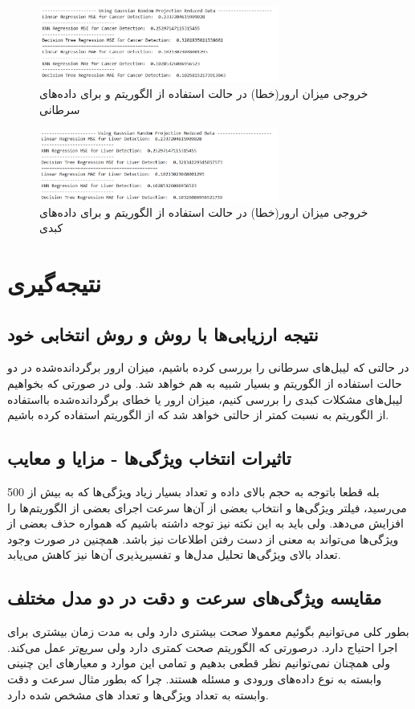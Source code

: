 \documentclass{article}
\begin{document}
\newpage
\begin{figure}[ht]
        \centering
        \includegraphics[width=0.7\textwidth]{gau-cancer.png}
        \caption{خروجی میزان ارور(خطا) در حالت استفاده از الگوریتم  و برای داده‌های سرطانی}
        \label{fig:fig5}
\end{figure}

\begin{figure}[ht]
        \centering
        \includegraphics[width=0.7\textwidth]{gau-liver.png}
        \caption{خروجی میزان ارور(خطا) در حالت استفاده از الگوریتم  و برای داده‌های کبدی}
        \label{fig:fig6}
\end{figure}

\newpage
\section{نتیجه‌گیری}
\subsection{نتیجه ارزیابی‌ها با روش  و روش انتخابی خود}
در حالتی که لیبل‌های سرطانی را بررسی کرده باشیم، میزان ارور برگردانده‌شده در دو حالت استفاده از الگوریتم  و  بسیار شبیه به هم خواهد شد. ولی در صورتی که بخواهیم لیبل‌های مشکلات کبدی را بررسی کنیم، میزان ارور یا خطای برگردانده‌شده بااستفاده از الگوریتم  به نسبت کمتر از حالتی خواهد شد که از الگوریتم  استفاده کرده باشیم.
\subsection{تاثیرات انتخاب ویژگی‌ها - مزایا و معایب}
بله قطعا باتوجه به حجم بالای داده و تعداد بسیار زیاد ویژگی‌ها که به بیش از 500 می‌رسید، فیلتر ویژگی‌ها و انتخاب بعضی از آن‌ها سرعت اجرای بعضی از الگوریتم‌ها را افزایش می‌دهد. ولی باید به این نکته نیز توجه داشته باشیم که همواره حذف بعضی از ویژگی‌ها می‌تواند به معنی از دست رفتن اطلاعات نیز باشد. همچنین در صورت وجود تعداد بالای ویژگی‌ها تحلیل مدل‌ها و تفسیرپذیری آن‌ها نیز کاهش می‌یابد.

\subsection{مقایسه ویژگی‌های سرعت و دقت در دو مدل مختلف}
بطور کلی می‌توانیم بگوئیم  معمولا صحت بیشتری دارد ولی به مدت زمان بیشتری برای اجرا احتیاج دارد. درصورتی که الگوریتم  صحت کمتری دارد ولی سریع‌تر عمل می‌کند. ولی همچنان نمی‌توانیم نظر قطعی بدهیم و تمامی این موارد و معیارهای این چنینی وابسته به نوع داده‌های ورودی و مسئله هستند. چرا که بطور مثال سرعت و دقت  وابسته به تعداد ویژگی‌ها و تعداد های مشخص شده دارد.
\end{document}
